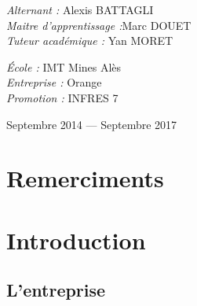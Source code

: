 \documentclass[12pt,a4paper]{report}
\begin{document}
\begin{titlepage}
\begin{center}
    \begin{minipage}{0.5\textwidth}
      \begin{flushleft} \large
        \emph{Alternant :} Alexis \textsc{BATTAGLI}\\
        \emph{Maitre d'apprentissage :}Marc \textsc{DOUET}\\
        \emph{Tuteur académique : } Yan \textsc{MORET}
      \end{flushleft}
    \end{minipage}
    \begin{minipage}{0.4\textwidth}
      \begin{flushright} \large
      	\emph{École :} IMT Mines Alès\\
       	\emph{Entreprise :} Orange\\
        \emph{Promotion :} INFRES 7\\
      \end{flushright}
    \end{minipage}

    \vfill

    {\large Septembre 2014 — Septembre 2017}

  \end{center}
\end{titlepage}

\newpage
\section*{Remerciments}

\newpage
\tableofcontents
\printnoidxglossaries
\listoffigures

\newpage
\section{Introduction}
\subsection{L'entreprise}
\end{document}
